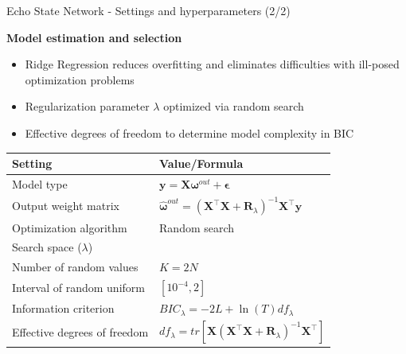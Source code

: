 \documentclass[aspectratio=169]{beamer}
\begin{document}
\begin{frame}[t]{Echo State Network  - Settings and hyperparameters (2/2)}
    \begin{minipage}[t]{0.3\textwidth}
        \vspace{0pt}
        \textbf{Model estimation and selection}
        \begin{itemize}
        	\item Ridge Regression reduces overfitting and eliminates difficulties with ill-posed optimization problems
        	\item Regularization parameter $\lambda$ optimized via random search
        	\item Effective degrees of freedom to determine model complexity in BIC
        \end{itemize}
    \end{minipage}%
    \hfill
    \begin{minipage}[t]{0.7\textwidth}
        \vspace{0pt}
        	\begin{table}[ht]
        	\scriptsize
			\centering
				\begin{tabular}{ll}
				\toprule
				\textbf{Setting}                          & \textbf{Value/Formula}	 \\
				\midrule
				Model type                                & $\mathbf{y} = \mathbf{X} \boldsymbol{\omega}^{out} + \boldsymbol{\epsilon}$	 \\
				Output weight matrix                      & $\boldsymbol{\hat{\omega}}^{out} = (\mathbf{X}^\top \mathbf{X} + \mathbf{R}_{\lambda})^{-1}\mathbf{X}^\top\mathbf{y}$ \\
				Optimization algorithm                    & Random search 	 \\
				Search space ($\lambda$)                  &  				 \\
				\hspace{2.5mm} Number of random values    & $K = 2N$             \\
				\hspace{2.5mm} Interval of random uniform & $[10^{-4}, 2]$   \\
				Information criterion                     & $BIC_{\lambda} = -2 L + \ln(T) df_{\lambda}$ \\
				Effective degrees of freedom	          & $df_{\lambda} = tr[{\mathbf{X}{{({\mathbf{X}^{\top}\mathbf{X} + \mathbf{R}_{\lambda}})}^{ - 1}}\mathbf{X}^{\top}}]$ \\
				\bottomrule
				\end{tabular}
			\end{table}
    \end{minipage}
\end{frame}
\end{document}
